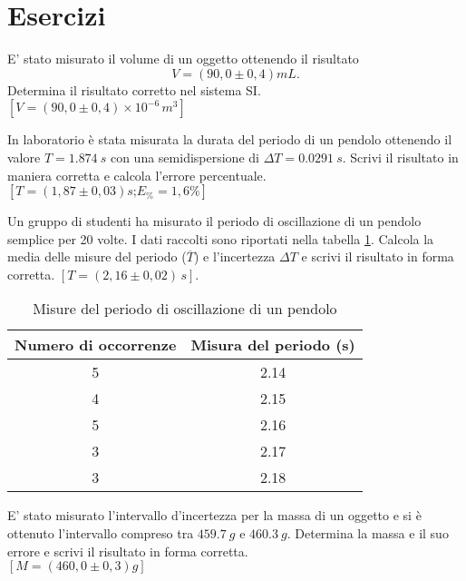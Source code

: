 \section{Esercizi}
\begin{esercizio}
E' stato misurato il volume di un oggetto ottenendo il risultato
\[
V=\left( 90,0 \pm 0,4\right)\si{mL}.
\]
Determina il risultato corretto nel sistema SI.\\
\hspace*{\fill}$\left[V=\left( 90,0 \pm 0,4\right)\times10^{-6}\,\si{m^3}\right]$ 
\end{esercizio}

\begin{esercizio}
In laboratorio è stata misurata la durata del periodo di un pendolo ottenendo il valore $T=\SI{1,874}{s}$ con una semidispersione di $\Delta T =\SI{0,0291}{s}$. Scrivi il risultato in maniera corretta e calcola l'errore percentuale.\\
\hspace*{\fill} $\left[T=\left(1,87 \pm 0,03\right)\si{s}\text{;} E_{\%}=1,6\%\right]$
\end{esercizio}

\begin{esercizio}
Un gruppo di studenti ha misurato il periodo di oscillazione di un pendolo semplice per 20 volte. I dati raccolti sono riportati nella tabella \ref{tab:pend}. Calcola la media delle misure del periodo (\(\overline{T}\)) e l'incertezza $\Delta T$ e scrivi il risultato in forma corretta.
\hspace*{\fill} $\left[T=\left(2,16 \pm 0,02 \right) \,\si{s} \right]$.
\begin{table}[h!]
\centering
\caption{Misure del periodo di oscillazione di un pendolo}
\label{tab:pend}
\begin{tabular}{cc}
\toprule
\textbf{Numero di occorrenze} & \textbf{Misura del periodo (s)} \\
\midrule
5  & 2.14 \\
4  & 2.15 \\
5  & 2.16 \\
3  & 2.17 \\
3  & 2.18 \\
\bottomrule
\end{tabular}
\end{table}


\end{esercizio}


\begin{esercizio}
E' stato misurato l'intervallo d'incertezza per la massa di un oggetto e si è ottenuto l'intervallo compreso tra $\SI{459,7}{g}$ e $\SI{460,3}{g}$. Determina la massa e il suo errore e scrivi il risultato in forma corretta.\\
 \hspace*{\fill}  $\left[M=\left(460,0 \pm 0,3\right)\si{g}\right]$
\end{esercizio}


